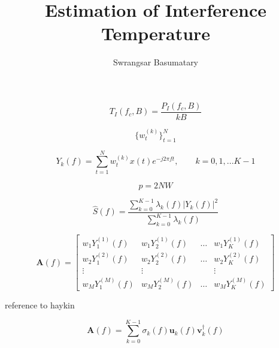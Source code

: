 \documentclass[12pt]{article}
\title{Estimation of Interference Temperature}
\author{Swrangsar Basumatary}
\begin{document}
\maketitle

\begin{equation*}
    T_I(f_c, B) = \frac{P_I(f_c, B)}{kB}
\end{equation*}

\begin{equation*}
    \{w_t^{(k)}\}_{t=1}^{N}
\end{equation*}

\begin{equation}
   Y_k(f) = \sum_{t=1}^N w_t^{(k)} x(t) e^{-j2\pi{}ft}, \qquad k = 0, 1, ...K-1
\end{equation}

\begin{equation}
    p = 2NW
\end{equation}

\begin{equation}
    \hat{S}(f) = \frac{\sum_{k=0}^{K-1} \lambda_k(f) |Y_k(f)|^2}{\sum_{k=0}^{K-1} \lambda_k(f)}
\end{equation}

\begin{equation}
    \mathbf{A}(f) = 
    \begin{bmatrix}
        w_1Y_1^{(1)}(f) & w_1Y_2^{(1)}(f) & \ldots & w_1Y_K^{(1)}(f) \\
        w_2Y_1^{(2)}(f) & w_2Y_2^{(2)}(f) & \ldots & w_2Y_K^{(2)}(f) \\
        \vdots & \vdots && \vdots \\
        w_MY_1^{(M)}(f) & w_MY_2^{(M)}(f) & \ldots & w_MY_K^{(M)}(f)
    \end{bmatrix}
\end{equation}

reference to haykin \cite{haykin2005}

\begin{equation}
    \mathbf{A}(f) = \sum_{k=0}^{K-1} \sigma_k(f) \mathbf{u}_k(f) \mathbf{v}_k^{\dag}(f)
\end{equation}



\end{document}
